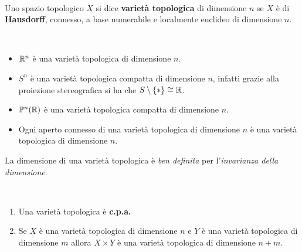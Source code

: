 \begin{define}~{}\\
	Uno spazio topologico $X$ si dice \textbf{varietà topologica} di dimensione $n$ se $X$ è di \textbf{Hausdorff}, connesso, a base numerabile e localmente euclideo di dimensione $n$.
\end{define}

\begin{examples}~{}
	\begin{itemize}
		\item $\mathbb{R}^n$ è una varietà topologica di dimensione $n$.
		\item $S^n$ è una varietà topologica compatta di dimensione $n$, infatti grazie alla proiezione stereografica si ha che $S\setminus\{*\}\cong \mathbb{R}$.
		\item $\mathbb{P}^n(\mathbb{R})$ è una varietà topologica compatta di dimensione $n$.
		\item Ogni aperto connesso di una varietà topologica di dimensione $n$ è una varietà topologica di dimensione $n$.
	\end{itemize}
\vspace{-3mm}
\end{examples}
\begin{observe}
	La dimensione di una varietà topologica è \textit{ben definita} per l'\textit{invarianza della dimensione}.
\end{observe}
\begin{observes}~{}
	\begin{enumerate}
		\item Una varietà topologica è \textbf{c.p.a.}
		\item Se $X$ è una varietà topologica di dimensione $n$ e $Y$ è una varietà topologica di dimensione $m$ allora $X\times Y$ è una varietà topologica di dimensione $n+m$.
		\vspace{-3mm}
	\end{enumerate}
\end{observes}

